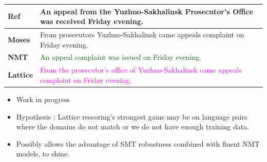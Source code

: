 \documentclass[landscape]{jhuslides3C}
\begin{document}
\vspace{10mm}
\begin{center}
\begin{tabular}{|p{3cm}|p{20cm}|}
\textbf{Ref} & An appeal from the Yuzhno-Sakhalinsk Prosecutor's Office was received Friday evening.\\[1cm] \hline \hline
\textbf{Moses} & \textcolor{verydarkorange}{From prosecutors Yuzhno-Sakhalinsk came appeals complaint on Friday evening.}\\[1cm] \hline \hline
\textbf{NMT} & \textcolor{darkgreen}{An appeal complaint was issued on Friday evening.}\\[1cm] \hline \hline
\textbf{Lattice} & \textcolor{magenta}{From the prosecutor's office of Yuzhno-Sakhalinsk came appeals complaint on Friday evening.}
\end{tabular}
\end{center}

\begin{itemize}
\item Work in progress
\item Hypothesis : Lattice rescoring's strongest gains may be on language pairs where the domains do not match or we do not have enough training data.
\item Possibly allows the advantage of SMT robustness combined with fluent NMT models, to shine. 
\end{itemize}
\end{document}
